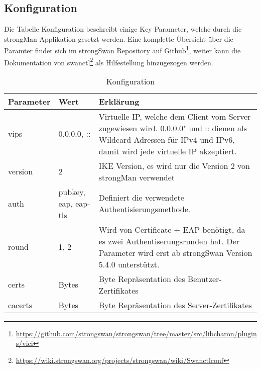 \subsection{Konfiguration}
Die Tabelle Konfiguration beschreibt einige Key Parameter, welche durch die strongMan Applikation gesetzt werden. Eine komplette Übersicht über die Paramter findet sich im strongSwan Repository auf Github\footnote{\url{https://github.com/strongswan/strongswan/tree/master/src/libcharon/plugins/vici}}, weiter kann die Dokumentation von swanctl\footnote{\url{https://wiki.strongswan.org/projects/strongswan/wiki/Swanctlconf}} als Hilfestellung hinzugezogen werden.\\
\begin{table}[H]
\centering
    \begin{tabular}{|p{}|p{}|p{}|}
    \hline
    \rowcolor{lightblue}
    Parameter & Wert & Erklärung \\ \hline
	vips	&	0.0.0.0,  :: & Virtuelle IP, welche dem Client vom Server zugewiesen wird. 0.0.0.0" und :: dienen als Wildcard-Adressen für IPv4 und IPv6, damit wird jede virtuelle IP akzeptiert.	\\ \hline
	version & 2 & IKE Version, es wird nur die Version 2 von strongMan verwendet \\ \hline
	auth & pubkey, eap, eap-tls & Definiert die verwendete Authentisierungsmethode. \\ \hline
	round & 1, 2 & Wird von Certificate + EAP benötigt, da es zwei Authentiserungsrunden hat. Der Parameter wird erst ab strongSwan Version 5.4.0 unterstützt. \\ \hline
	certs & Bytes & Byte Repräsentation des Benutzer-Zertifikates	\\ \hline
	cacerts & Bytes & Byte Repräsentation des Server-Zertifikates	\\ \hline
	\end{tabular}
    \caption[Konfiguration]{Konfiguration}
\end{table}
\newpage

